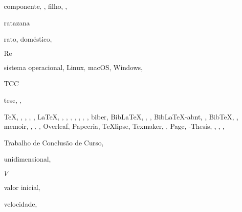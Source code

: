 \begin{RemissiveIndex}
\subitem componente, , 
\subitem filho, , 
\indexspace%
\item ratazana 
\item rato, 
\subitem doméstico, 
\item \ensuremath{\mathrm{Re}} 
\indexspace%
\item sistema operacional, 
\subitem Linux, 
\subitem macOS, 
\subitem Windows, 
\indexspace%
\item TCC 
\item tese, , 
\item \TeX, , , , , 
\subitem \LaTeX, , , , , , , , 
\subsubitem biber, 
\subsubitem Bib\LaTeX, , , 
\subsubitem Bib\LaTeX-abnt, , 
\subsubitem Bib\TeX, , 
\subsubitem memoir, , , , 
\subsubitem Overleaf, 
\subsubitem Papeeria, 
\subsubitem TeXlipse, 
\subsubitem Texmaker, , 
\subsubitem {\TeX}Page, 
\subsubitem \UTFPR-Thesis, , , , 
\item Trabalho de Conclusão de Curso, 
\indexspace%
\item unidimensional, 
\indexspace%
\item \ensuremath{V} 
\item valor inicial, 
\item velocidade, 
\end{RemissiveIndex}
